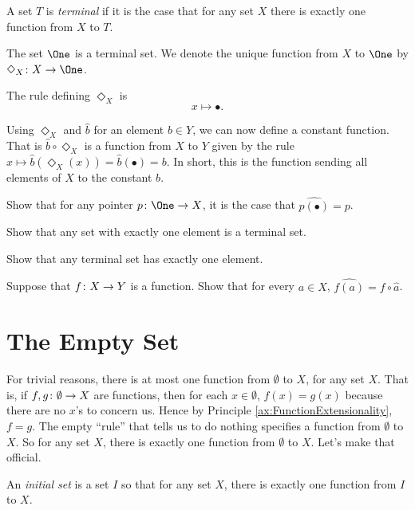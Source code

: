 \begin{defn}\label{def:terminal}
	A set $T$ is \emph{terminal} if it is the case that for any set $X$ there is exactly one function from $X$ to $T$.
\end{defn}

\begin{principle}
	The set $\One$ is a terminal set. 
	We denote the unique function from $X$ to $\One$ by $\fromto {\Diamond_X}{X}\One$.
	
	The rule defining $\Diamond_X$ is
	\[x\mapsto\bullet.\]
\end{principle}

Using $\Diamond_X$ and $\hat{b}$ for an element $b\in Y$, we can now define a constant function. 
That is $\hat{b}\circ\Diamond_X$ is a function from $X$ to $Y$ given by the rule
$x\mapsto \hat{b}(\Diamond_X(x))= \hat{b}(\bullet) = b$. 
In short, this is the function sending all elements of $X$ to the constant $b$. 

\begin{exercises}
	\begin{firstexercise}
		\item Show that for any pointer $\fromto p\One X$, it is the case that $\widehat{p(\bullet)}=p$.
		\item Show that any set with exactly one element is a terminal set.
		\item Show that any terminal set has exactly one element.
		\item Suppose that ${f}\colon{X}\to{Y}$ is a function. Show that for every $a\in X$, $\widehat{f(a)} = f\circ \hat{a}$.
	\end{firstexercise}
\end{exercises}

\section{The Empty Set}

For trivial reasons, there is at most one function from $\emptyset$ to $X$,
for any set $X$. That is,  if ${f,g}\colon{\emptyset}\to{X}$ are functions, then
for each $x\in\emptyset$, $f(x)=g(x)$ because there are no $x$'s to concern us. Hence by Principle \ref{ax:FunctionExtensionality}, $f=g$. The empty ``rule'' that tells us to do nothing specifies a function from $\emptyset$ to $X$. So for any set $X$, there is exactly one function from $\emptyset$ to $X$. Let's make that official.

\begin{defn}
	An \emph{initial set} is a set $I$ so that for any set $X$, there is exactly one function from $I$ to $X$.
\end{defn}

